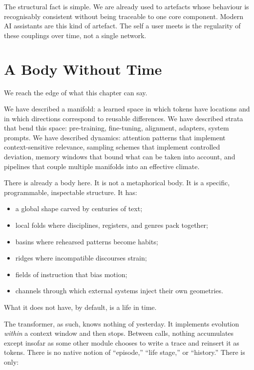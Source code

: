 \documentclass[12pt,a4paper]{article}
\begin{document}
The structural fact is simple. We are already used to artefacts whose behaviour is recognisably consistent without being traceable to one core component. Modern AI assistants are this kind of artefact. The self a user meets is the regularity of these couplings over time, not a single network.

\section{A Body Without Time}

We reach the edge of what this chapter can say.

We have described a manifold: a learned space in which tokens have locations and in which directions correspond to reusable differences. We have described strata that bend this space: pre-training, fine-tuning, alignment, adapters, system prompts. We have described dynamics: attention patterns that implement context-sensitive relevance, sampling schemes that implement controlled deviation, memory windows that bound what can be taken into account, and pipelines that couple multiple manifolds into an effective climate.

There is already a body here. It is not a metaphorical body. It is a specific, programmable, inspectable structure. It has:

\begin{itemize}
  \item a global shape carved by centuries of text;
  \item local folds where disciplines, registers, and genres pack together;
  \item basins where rehearsed patterns become habits;
  \item ridges where incompatible discourses strain;
  \item fields of instruction that bias motion;
  \item channels through which external systems inject their own geometries.
\end{itemize}

What it does not have, by default, is a life in time.

The transformer, as such, knows nothing of yesterday. It implements evolution \emph{within} a context window and then stops. Between calls, nothing accumulates except insofar as some other module chooses to write a trace and reinsert it as tokens. There is no native notion of ``episode,'' ``life stage,'' or ``history.'' There is only:
\end{document}
